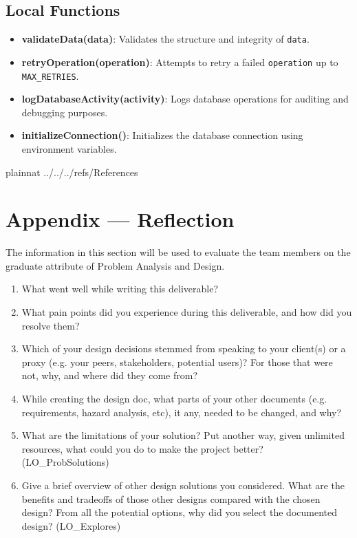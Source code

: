 \documentclass[12pt, titlepage]{article}
\begin{document}
\subsection{Local Functions}
\begin{itemize}
    \item \textbf{validateData(data)}: Validates the structure and integrity of \texttt{data}.
    \item \textbf{retryOperation(operation)}: Attempts to retry a failed \texttt{operation} up to \texttt{MAX\_RETRIES}.
    \item \textbf{logDatabaseActivity(activity)}: Logs database operations for auditing and debugging purposes.
    \item \textbf{initializeConnection()}: Initializes the database connection using environment variables.
\end{itemize}

 {plainnat}
 {../../../refs/References}

\newpage


\section*{Appendix --- Reflection}

The information in this section will be used to evaluate the team members on the
graduate attribute of Problem Analysis and Design.



\begin{enumerate}
  \item What went well while writing this deliverable? 
  \item What pain points did you experience during this deliverable, and how
    did you resolve them?
  \item Which of your design decisions stemmed from speaking to your client(s)
  or a proxy (e.g. your peers, stakeholders, potential users)? For those that
  were not, why, and where did they come from?
  \item While creating the design doc, what parts of your other documents (e.g.
  requirements, hazard analysis, etc), it any, needed to be changed, and why?
  \item What are the limitations of your solution?  Put another way, given
  unlimited resources, what could you do to make the project better? (LO\_ProbSolutions)
  \item Give a brief overview of other design solutions you considered.  What
  are the benefits and tradeoffs of those other designs compared with the chosen
  design?  From all the potential options, why did you select the documented design?
  (LO\_Explores)
\end{enumerate}
\end{document}
